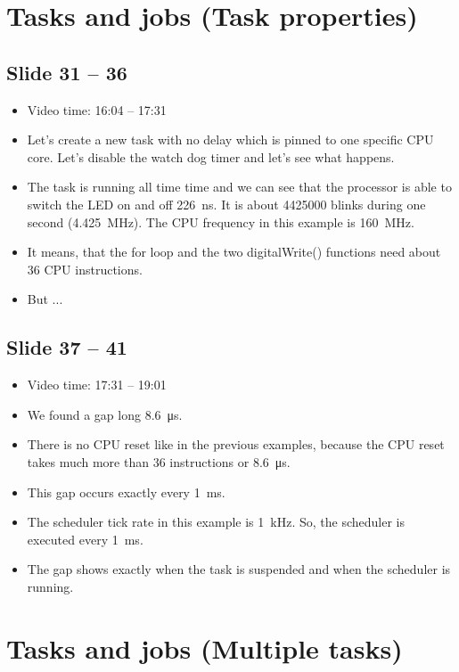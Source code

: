 \documentclass[12pt, a4paper]{article}
\begin{document}
	\section{Tasks and jobs (Task properties)}
	\subsection{Slide 31 -- 36}
	\begin{itemize}
		\item Video time: 16:04 -- 17:31
		\item Let's create a new task with no delay which is pinned to one specific CPU core. Let's disable the watch dog timer and let's see what happens.
		\item The task is running all time time and we can see that the processor is able to switch the LED on and off \SI{226}{ns}. It is about 4425000 blinks during one second (\SI{4.425}{MHz}). The CPU frequency in this example is \SI{160}{MHz}.
		\item It means, that the for loop and the two digitalWrite() functions need about 36 CPU instructions.
		\item But ...
	\end{itemize}

	\subsection{Slide 37 -- 41}
	\begin{itemize}
		\item Video time: 17:31 -- 19:01
		\item We found a gap long \SI{8.6}{\micro \second}.
		\item There is no CPU reset like in the previous examples, because the CPU reset takes much more than 36 instructions or \SI{8.6}{\micro \second}.
		\item This gap occurs exactly every \SI{1}{ms}.
		\item The scheduler tick rate in this example is \SI{1}{kHz}. So, the scheduler is executed every \SI{1}{ms}.
		\item The gap shows exactly when the task is suspended and when the scheduler is running.
	\end{itemize}

	\section{Tasks and jobs (Multiple tasks)}
\end{document}
